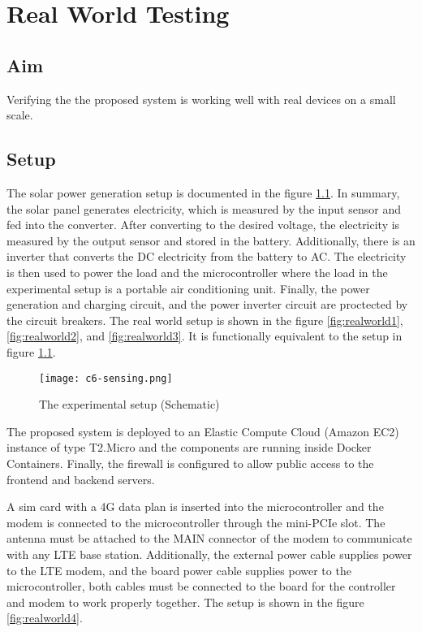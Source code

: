 \documentclass[../thesis.tex]{subfiles}
\begin{document}
\chapter{Real World Testing}

\section{Aim}

Verifying the the proposed system is working well with real devices on a small scale.

\section{Setup} %

The solar power generation setup is documented in the figure \ref{fig:realworldsensing}. In summary, the solar panel generates electricity, which is measured by the input sensor and fed into the converter. After converting to the desired voltage, the electricity is measured by the output sensor and stored in the battery. Additionally, there is an inverter that converts the DC electricity from the battery to AC. The electricity is then used to power the load and the microcontroller where the load in the experimental setup is a portable air conditioning unit. Finally, the power generation and charging circuit, and the power inverter circuit are proctected by the circuit breakers. The real world setup is shown in the figure \ref{fig:realworld1}, \ref{fig:realworld2}, and \ref{fig:realworld3}. It is functionally equivalent to the setup in figure \ref{fig:realworldsensing}.

\begin{figure}[!ht]
	\centering
	\texttt{[image: c6-sensing.png]}
	\caption{The experimental setup (Schematic)}
	\label{fig:realworldsensing}
\end{figure}

The proposed system is deployed to an Elastic Compute Cloud (Amazon EC2) instance of type T2.Micro and the components are running inside Docker Containers. Finally, the firewall is configured to allow public access to the frontend and backend servers. 

A sim card with a 4G data plan is inserted into the microcontroller and the modem is connected to the microcontroller through the mini-PCIe slot. The antenna must be attached to the MAIN connector of the modem to communicate with any LTE base station. Additionally, the external power cable supplies power to the LTE modem, and the board power cable supplies power to the microcontroller, both cables must be connected to the board for the controller and modem to work properly together. The setup is shown in the figure \ref{fig:realworld4}. 
\end{document}
